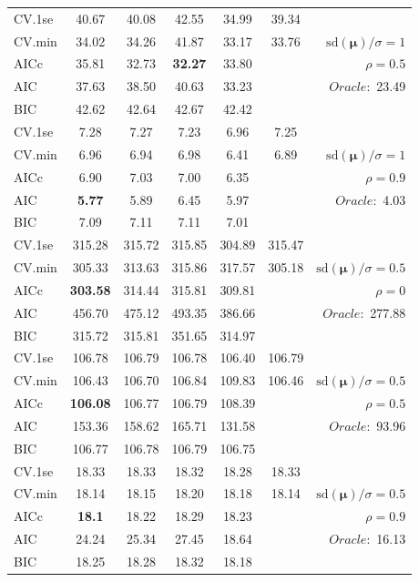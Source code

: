 \begin{table}
\begin{center}
\begin{tabular}{l*{5}{c}|r}
 \hline 
CV.1se & 40.67 & 40.08 & 42.55 & 34.99 & 39.34 & \\
CV.min & 34.02 & 34.26 & 41.87 & 33.17 & 33.76 &  $\mathrm{sd}(\mathbf{\mu})/\sigma=1$ \\
AICc & 35.81 & 32.73 & {\bf 32.27} & 33.80 & & $\rho=0.5$ \\
AIC & 37.63 & 38.50 & 40.63 & 33.23 & &  \multirow{2}{*}{$Oracle: $ 23.49} \\
BIC & 42.62 & 42.64 & 42.67 & 42.42 & &  \\
 \hline 
CV.1se & 7.28 & 7.27 & 7.23 & 6.96 & 7.25 & \\
CV.min & 6.96 & 6.94 & 6.98 & 6.41 & 6.89 &  $\mathrm{sd}(\mathbf{\mu})/\sigma=1$ \\
AICc & 6.90 & 7.03 & 7.00 & 6.35 & & $\rho=0.9$ \\
AIC & {\bf 5.77} & 5.89 & 6.45 & 5.97 & &  \multirow{2}{*}{$Oracle: $ 4.03} \\
BIC & 7.09 & 7.11 & 7.11 & 7.01 & &  \\
 \hline 
CV.1se & 315.28 & 315.72 & 315.85 & 304.89 & 315.47 & \\
CV.min & 305.33 & 313.63 & 315.86 & 317.57 & 305.18 &  $\mathrm{sd}(\mathbf{\mu})/\sigma=0.5$ \\
AICc & {\bf 303.58} & 314.44 & 315.81 & 309.81 & & $\rho=0$ \\
AIC & 456.70 & 475.12 & 493.35 & 386.66 & &  \multirow{2}{*}{$Oracle: $ 277.88} \\
BIC & 315.72 & 315.81 & 351.65 & 314.97 & &  \\
 \hline 
CV.1se & 106.78 & 106.79 & 106.78 & 106.40 & 106.79 & \\
CV.min & 106.43 & 106.70 & 106.84 & 109.83 & 106.46 &  $\mathrm{sd}(\mathbf{\mu})/\sigma=0.5$ \\
AICc & {\bf 106.08} & 106.77 & 106.79 & 108.39 & & $\rho=0.5$ \\
AIC & 153.36 & 158.62 & 165.71 & 131.58 & &  \multirow{2}{*}{$Oracle: $ 93.96} \\
BIC & 106.77 & 106.78 & 106.79 & 106.75 & &  \\
 \hline 
CV.1se & 18.33 & 18.33 & 18.32 & 18.28 & 18.33 & \\
CV.min & 18.14 & 18.15 & 18.20 & 18.18 & 18.14 &  $\mathrm{sd}(\mathbf{\mu})/\sigma=0.5$ \\
AICc & {\bf 18.1} & 18.22 & 18.29 & 18.23 & & $\rho=0.9$ \\
AIC & 24.24 & 25.34 & 27.45 & 18.64 & &  \multirow{2}{*}{$Oracle: $ 16.13} \\
BIC & 18.25 & 18.28 & 18.32 & 18.18 & &  \\
 \hline 
\end{tabular}
\end{center}
\vspace{-1cm}
\end{table}



